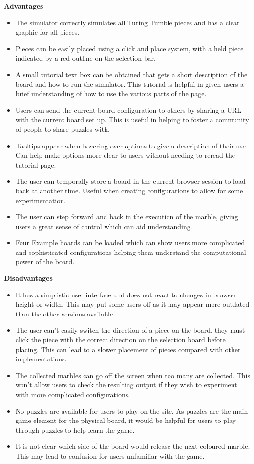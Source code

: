 \documentclass{l4proj}
\begin{document}
\textbf{Advantages}
\begin{itemize}
    \item The simulator correctly simulates all Turing Tumble pieces and has a clear graphic for all pieces.
    \item Pieces can be easily placed using a click and place system, with a held piece indicated by a red outline on the selection bar.
    \item A small tutorial text box can be obtained that gets a short description of the board and how to run the simulator. This tutorial is helpful in given users a brief understanding of how to use the various parts of the page.
    \item Users can send the current board configuration to others by sharing a URL with the current board set up. This is useful in helping to foster a community of people to share puzzles with.
    \item Tooltips appear when hovering over options to give a description of their use. Can help make options more clear to users without needing to reread the tutorial page.
    \item The user can temporally store a board in the current browser session to load back at another time. Useful when creating configurations to allow for some experimentation.
    \item The user can step forward and back in the execution of the marble, giving users a great sense of control which can aid understanding.
    \item Four Example boards can be loaded which can show users more complicated and sophisticated configurations helping them understand the computational power of the board.
\end{itemize}

\textbf{Disadvantages}
\begin{itemize}
    \item It has a simplistic user interface and does not react to changes in browser height or width. This may put some users off as it may appear more outdated than the other versions available.
    \item The user can't easily switch the direction of a piece on the board, they must click the piece with the correct direction on the selection board before placing. This can lead to a slower placement of pieces compared with other implementations.
    \item The collected marbles can go off the screen when too many are collected. This won't allow users to check the resulting output if they wish to experiment with more complicated configurations.
    \item No puzzles are available for users to play on the site. As puzzles are the main game element for the physical board, it would be helpful for users to play through puzzles to help learn the game.
    \item It is not clear which side of the board would release the next coloured marble. This may lead to confusion for users unfamiliar with the game.
\end{itemize}
\end{document}
